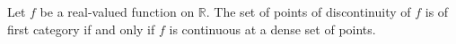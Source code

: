 Let $f$ be a real-valued function on $\mathbb{R}$. The set of points of discontinuity of $f$ is of first category if and only if $f$ is continuous at a dense set of points.
